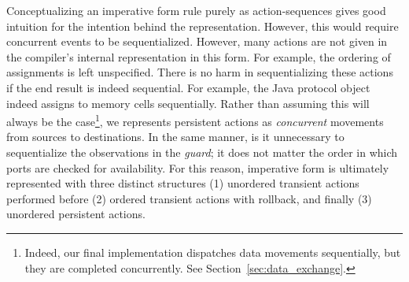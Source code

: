 Conceptualizing an imperative form rule purely as action-sequences gives good intuition for the intention behind the representation. However, this would require concurrent events to be sequentialized. However, many actions are not given in the compiler's internal representation in this form. For example, the ordering of assignments is left unspecified. There is no harm in sequentializing these actions if the end result is indeed sequential. For example, the Java protocol object indeed assigns to memory cells sequentially. Rather than assuming this will always be the case\footnote{Indeed, our final implementation dispatches data movements sequentially, but they are completed concurrently. See Section~\ref{sec:data_exchange}.}, we represents persistent actions as \textit{concurrent} movements from sources to destinations. In the same manner, is it unnecessary to sequentialize the observations in the \textit{guard}; it does not matter the order in which ports are checked for availability. For this reason, imperative form is ultimately represented with three distinct structures (1) unordered transient actions performed before (2) ordered transient actions with rollback, and finally (3) unordered persistent actions.



